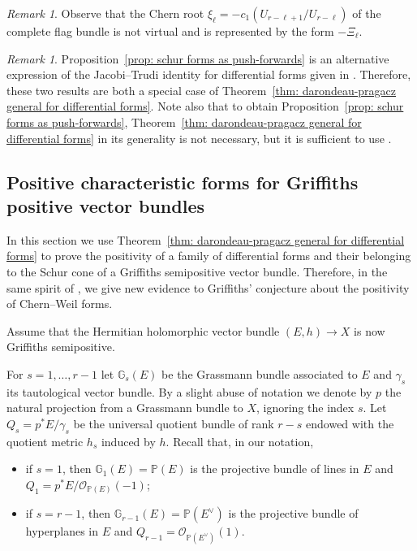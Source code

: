 \documentclass[a4paper]{amsart}
\theoremstyle{plain}%
\theoremstyle{definition}
\theoremstyle{remark}
\newtheorem{remark}[theorem]{Remark}
\newcommand{\PP}{\mathbb{P}}
\newcommand{\GG}{\mathbb{G}}
\begin{document}
\begin{remark}
	Observe that the Chern root $ \xi_\ell = - c_1(U_{r-\ell+1}/U_{r-\ell}) $ of the complete flag bundle is not virtual and is represented by the form $ -\Xi_\ell $.
\end{remark}

\begin{remark}
	Proposition~\ref{prop: schur forms as push-forwards} is an alternative expression of the Jacobi--Trudi identity for differential forms given in \cite[Theorem~{A.2}]{Fin20}.
	Therefore, these two results are both a special case of Theorem~\ref{thm: darondeau-pragacz general for differential forms}.
	Note also that to obtain Proposition~\ref{prop: schur forms as push-forwards}, Theorem~\ref{thm: darondeau-pragacz general for differential forms} in its generality is not necessary, but it is sufficient to use \cite[Theorem~{3.5}]{DF20}.
\end{remark}

\subsection{Positive characteristic forms for Griffiths positive vector bundles}
In this section we use Theorem~\ref{thm: darondeau-pragacz general for differential forms} to prove the positivity of a family of differential forms and their belonging to the Schur cone of a Griffiths semipositive vector bundle.
Therefore, in the same spirit of \cite{Gul12,DF20}, we give new evidence to Griffiths' conjecture about the positivity of Chern--Weil forms.

Assume that the Hermitian holomorphic vector bundle $ (E,h) \to X $ is now {Griffiths semipositive}.

For $ s = 1,\dots,r-1 $ let $ \GG_{s}(E) $ be the Grassmann bundle associated to $ E $ and $ \gamma_{s} $ its tautological vector bundle.
By a slight abuse of notation we denote by $ p $ the natural projection from a Grassmann bundle to $ X $, ignoring the index $ s $.
Let $ Q_s = p^{*}E / \gamma_{s} $ be the universal quotient bundle of rank $ r-s $ endowed with the quotient metric $ h_s $ induced by $ h $.
Recall that, in our notation,
\begin{itemize}
	\item if $ s = 1 $, then $ \GG_{1}(E) = \PP(E) $ is the projective bundle of lines in $ E $ and $ Q_1 = p^{*}E / \mathcal{O}_{\PP(E)}(-1) $;
	\item if $ s = r-1 $, then $ \GG_{r-1}(E) = \PP(E^{\vee}) $ is the projective bundle of hyperplanes in $ E $ and $ Q_{r-1} = \mathcal{O}_{\PP(E^{\vee})}(1) $.
\end{itemize}
\end{document}
